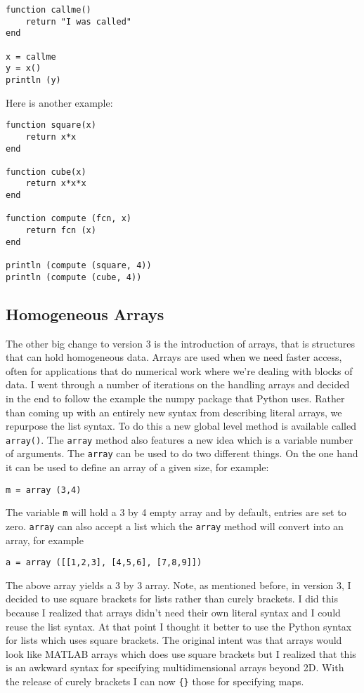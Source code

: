 \begin{lstlisting}
function callme()
    return "I was called"
end

x = callme
y = x()
println (y)
\end{lstlisting}

Here is another example:

\begin{lstlisting}
function square(x)
    return x*x
end

function cube(x)
    return x*x*x
end

function compute (fcn, x)
    return fcn (x)
end

println (compute (square, 4))
println (compute (cube, 4))
\end{lstlisting}

\subsection{Homogeneous Arrays}

The other big change to version 3 is the introduction of arrays, that is structures that can hold homogeneous data. Arrays are used when we need faster access, often for applications that do numerical work where we're dealing with blocks of data.  I went through a number of iterations on the handling arrays and decided in the end to follow the example the numpy package that Python uses. Rather than coming up with an entirely new syntax from describing literal arrays, we repurpose the list syntax. To do this a new global level method is available called {\tt array()}. The {\tt array} method also features a new idea which is a variable number of arguments. The {\tt array} can be used to do two different things. On the one hand it can be used to define an array of a given size, for example:

\begin{lstlisting}
m = array (3,4)
\end{lstlisting}

The variable {\tt m} will hold a 3 by 4 empty array and by default, entries are set to zero. {\tt array} can also accept a list which the {\tt array} method will convert into an array, for example

\begin{lstlisting}
a = array ([[1,2,3], [4,5,6], [7,8,9]])
\end{lstlisting}

The above array yields a 3 by 3 array. Note, as mentioned before, in version 3, I decided to use square brackets for lists rather than curely brackets. I did this because I realized that arrays didn't need their own literal syntax and I could reuse the list syntax. At that point I thought it better to use the Python syntax for lists which uses square brackets. The original intent was that arrays would look like MATLAB arrays which does use square brackets but I realized that this is an awkward syntax for specifying multidimensional arrays beyond 2D. With the release of curely brackets I can now {\tt \verb|{|\verb|}|} those for specifying maps.

